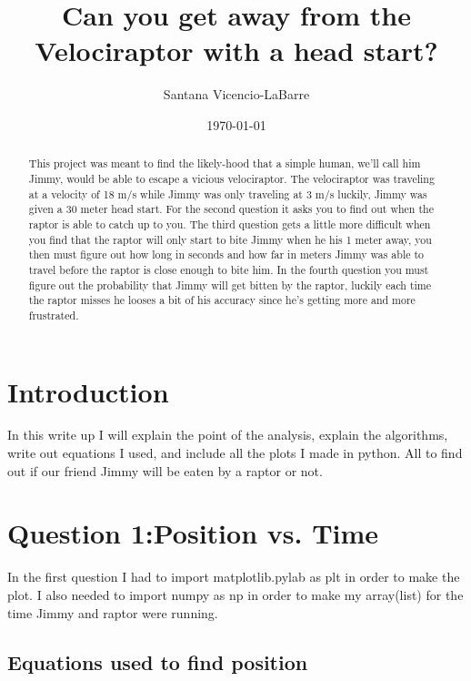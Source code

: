 \documentclass[twocolumn]{revtex4}
\begin{document}
\title{Can you get away from the Velociraptor with a head start?}

\author{Santana Vicencio-LaBarre}
\date{\today}

\begin{abstract}
This project was meant to find the likely-hood that a simple human, we'll call him Jimmy, would be able to escape a vicious velociraptor. The velociraptor was traveling at a velocity of 18 m/s while Jimmy was only traveling at 3 m/s luckily, Jimmy was given a 30 meter head start. For the second question it asks you to find out when the raptor is able to catch up to you. The third question gets a little more difficult when you find that the raptor will only start to bite Jimmy when he his 1 meter away, you then must figure out how long in seconds and how far in meters Jimmy was able to travel before the raptor is close enough to bite him. In the fourth question you must figure out the probability that Jimmy will get bitten by the raptor, luckily each time the raptor misses he looses a bit of his accuracy since he's getting more and more frustrated. 


\end{abstract}


\maketitle

\section{Introduction}

In this write up I will explain the point of the analysis, explain the algorithms, write out equations I used, and include all the plots I made in python. All to find out if our friend Jimmy will be eaten by a raptor or not.


\section{Question 1:Position vs. Time} 
In the first question I had to import matplotlib.pylab as plt in order to make the plot. I also needed to import numpy as np in order to make my array(list) for the time Jimmy and raptor were running. 

\subsection{Equations used to find position}
\end{document}
